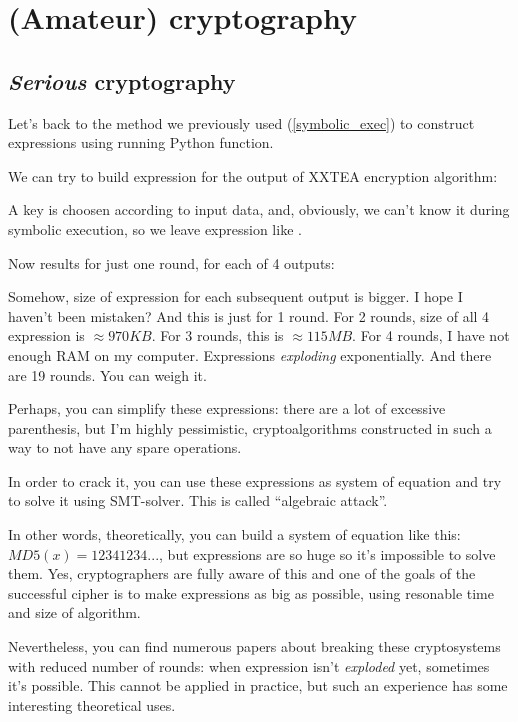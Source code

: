 \chapter{(Amateur) cryptography}
\label{crypto}

\section{\emph{Serious} cryptography}

Let's back to the method we previously used (\ref{symbolic_exec}) to construct expressions using running Python function.

We can try to build expression for the output of XXTEA encryption algorithm:



A key is choosen according to input data, and, obviously, we can't know it during symbolic execution, so we leave expression like .

Now results for just one round, for each of 4 outputs:



Somehow, size of expression for each subsequent output is bigger. I hope I haven't been mistaken?
And this is just for 1 round.
For 2 rounds, size of all 4 expression is $\approx 970KB$.
For 3 rounds, this is $\approx 115MB$.
For 4 rounds, I have not enough RAM on my computer.
Expressions \emph{exploding} exponentially.
And there are 19 rounds.
You can weigh it.

Perhaps, you can simplify these expressions: there are a lot of excessive parenthesis,
but I'm highly pessimistic, cryptoalgorithms constructed in such a way to not have any spare operations.

In order to crack it, you can use these expressions as system of equation and try to solve it using SMT-solver.
This is called ``algebraic attack''.

In other words, theoretically, you can build a system of equation like this: $MD5(x)=12341234...$,
but expressions are so huge so it's impossible to solve them.
Yes, cryptographers are fully aware of this and one of the goals of the successful cipher is
to make expressions as big as possible, using resonable time and size of algorithm.

Nevertheless, you can find numerous papers about breaking these cryptosystems with reduced number of rounds:
when expression isn't \emph{exploded} yet, sometimes it's possible.
This cannot be applied in practice, but such an experience has some interesting theoretical uses.

